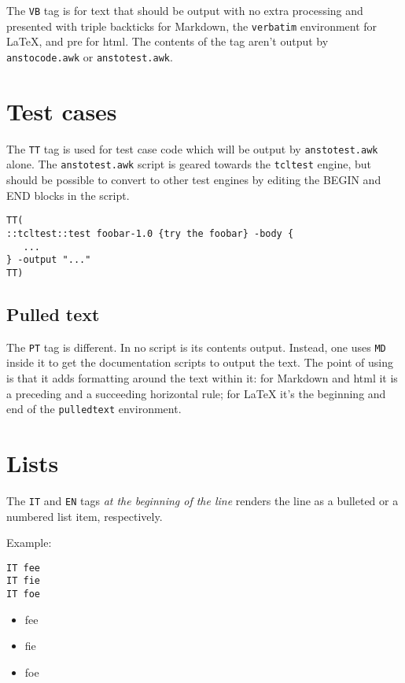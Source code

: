 The \texttt{VB} tag is for text that should be output with no extra processing and presented with triple backticks for Markdown, the \texttt{verbatim} environment for \LaTeX{}, and pre for html. The contents of the tag aren't output by \texttt{anstocode.awk} or \texttt{anstotest.awk}.

\section{Test cases}
\label{test-cases}

The \texttt{TT} tag is used for test case code which will be output by \texttt{anstotest.awk} alone. The \texttt{anstotest.awk} script is geared towards the \texttt{tcltest} engine, but should be possible to convert to other test engines by editing the BEGIN and END blocks in the script.

\begin{verbatim}
TT(
::tcltest::test foobar-1.0 {try the foobar} -body {
   ...
} -output "..."
TT)
\end{verbatim}

\begin{pulledtext}
\section{Pulled text}
\label{pulled-text}

The \texttt{PT} tag is different. In no script is its contents output. Instead, one uses \texttt{MD} inside it to get the documentation scripts to output the text. The point of using is that it adds formatting around the text within it: for Markdown and html it is a preceding and a succeeding horizontal rule; for \LaTeX{} it's the beginning and end of the \texttt{pulledtext} environment.

\end{pulledtext}

\section{Lists}
\label{lists}

The \texttt{IT} and \texttt{EN} tags \emph{at the beginning of the line} renders the line as a bulleted or a numbered list item, respectively.


Example:

\begin{verbatim}
IT fee
IT fie
IT foe
\end{verbatim}
\begin{itemize}
\item  fee
\item  fie
\item  foe
\end{itemize}

